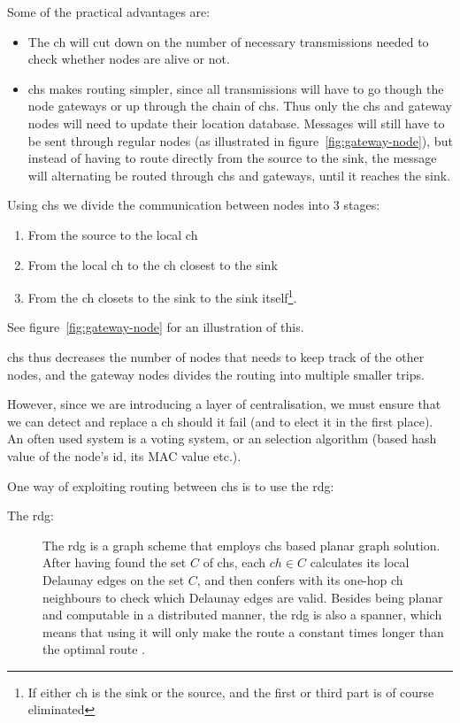 Some of the practical advantages are:
\begin{itemize}
\item The \ac{ch} will cut down on the number of necessary transmissions needed to check whether nodes are alive or not.
\item \acp{ch} makes routing simpler, since all transmissions will have to go though the node gateways or up through the chain of \acp{ch}. Thus only the \acp{ch} and gateway nodes will need to update their location database. Messages will still have to be sent through regular nodes (as illustrated in figure~\ref{fig:gateway-node}), but instead of having to route directly from the source to the sink, the message will alternating be routed through \acp{ch} and gateways, until it reaches the sink.
\end{itemize}

Using \acp{ch} we divide the communication between nodes into 3 stages:
\begin{enumerate}
\item From the source to the local \ac{ch} 
\item From the local \ac{ch} to the \ac{ch} closest to the sink
\item From the \ac{ch} closets to the sink to the sink itself\footnote{If either \ac{ch} is the sink or the source, and the first or third part is of course eliminated}.
\end{enumerate}
See figure~\ref{fig:gateway-node} for an illustration of this.

 \acp{ch} thus decreases the number of nodes that needs to keep track of the other nodes, and the gateway nodes divides the routing into multiple smaller trips.  

However, since we are introducing a layer of centralisation, we must ensure that we can detect and replace a \ac{ch} should it fail (and to elect it in the first place). An often used system is a voting system, or an selection algorithm (based hash value of the node's id, its MAC value etc.).

One way of exploiting routing between \acp{ch} is to use the \ac{rdg}:
\begin{description}
\item[The \ac{rdg}:] The \ac{rdg} is a graph scheme that employs \acp{ch} based planar graph solution. After having found the set $C$ of \acp{ch}, each $ch \in C$ calculates its local Delaunay edges on the set $C$, and then confers with its one-hop \ac{ch} neighbours to check which Delaunay edges are valid. Besides being planar and computable in a distributed manner, the \ac{rdg} is also a spanner, which means that using it will only make the route a constant times longer than the optimal route \cite{GeoSpanners}.
\end{description}

